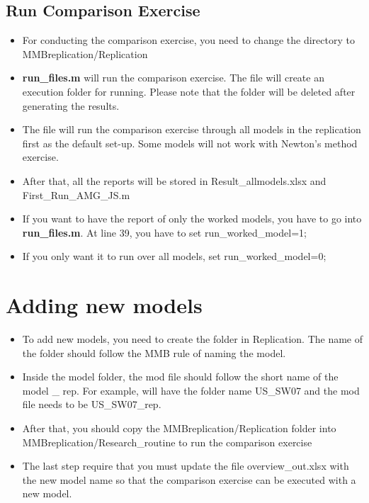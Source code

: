 \documentclass[10pt,a4paper]{article}
\begin{document}
	\subsection{Run Comparison Exercise}
	\begin{itemize}
		\item For conducting the comparison exercise, you need to change the directory to  MMB\textunderscore replication/Replication
		\medskip
		
		\item \textbf{run\_files.m} will run the comparison exercise. The file will create an execution folder for running. Please note that the folder will be deleted after generating the results.
		\medskip
		\item The file will run the comparison exercise through all models in the replication first as the default set-up. Some models will not work with Newton's method exercise.
		\medskip
		\item After that, all the reports will be stored in Result\_allmodels.xlsx and First\_Run\_AMG\_JS.m
		\medskip
		\item If you want to have the report of only the worked models, you have to go into \textbf{run\_files.m}. At line 39, you have to set run\_worked\_model=1;
		\medskip
		\item If you only want it to run over all models, set run\_worked\_model=0;
	\end{itemize}

	
\section{Adding new models}
\medskip
\begin{itemize}
	\item To add new models, you need to create the folder in Replication. The name of the folder should follow the MMB rule of naming the model.
	\medskip
	\item Inside the model folder, the mod file should follow the short name of the model \_ rep. For example, \cite{SmetsWouters2007} will have the folder name US\_SW07 and the mod file needs to be US\_SW07\_rep.
	\medskip
	\item After that, you should copy the MMB\textunderscore replication/Replication folder into MMB\textunderscore replication/Research\_routine to run the comparison exercise
	\medskip
	\item The last step require that you must update the file overview\_out.xlsx with the new model name so that the comparison exercise can be executed with a new model.
\end{itemize}
\end{document}
